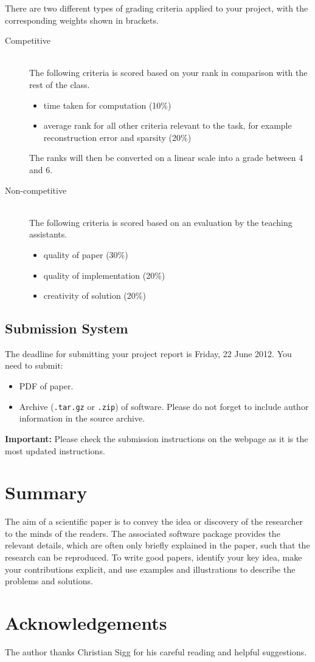 \documentclass[10pt,conference,compsocconf]{IEEEtran}
\begin{document}
There are two different types of grading criteria applied to your project, with the corresponding weights shown in brackets.
\begin{description}
\item[Competitive] \ \\
  The following criteria is scored based on your rank in comparison with the rest of the class.
  \begin{itemize}
  \item time taken for computation (10\%)
  \item average rank for all other criteria relevant to the task, for example reconstruction error and sparsity (20\%)
  \end{itemize}
  The ranks will then be converted on a linear scale into a grade between 4 and 6.
\item[Non-competitive] \ \\
  The following criteria is scored based on an evaluation by the teaching assistants.
  \begin{itemize}
  \item quality of paper (30\%)
  \item quality of implementation (20\%)
  \item creativity of solution (20\%)
  \end{itemize}
\end{description}

\subsection{Submission System}

The deadline for submitting your project report is Friday, 22 June 2012. You need to submit:
\begin{itemize}
\item PDF of paper.
\item Archive (\texttt{.tar.gz} or \texttt{.zip}) of software. Please do not forget to include author information in the source archive.
\end{itemize}

\textbf{Important:} Please check the submission instructions on the webpage as it is the most updated instructions. 

\section{Summary}

The aim of a scientific paper is to convey the idea or discovery of the researcher to the minds of the readers. The associated software package provides the relevant details, which are often only briefly explained in the paper, such that the research can be reproduced. To write good papers, identify your key idea, make your contributions explicit, and use examples and illustrations to describe the problems and solutions.

\section*{Acknowledgements}
The author thanks Christian Sigg for his careful reading and helpful suggestions.



\end{document}
